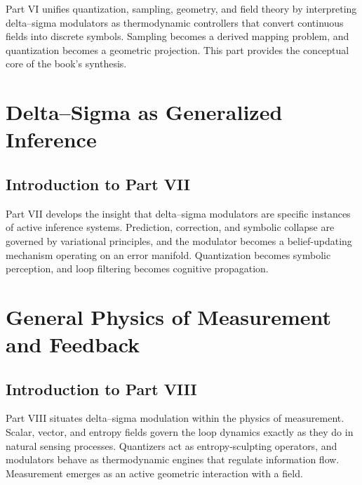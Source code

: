 \documentclass[12pt,oneside]{book}
\theoremstyle{definition}
\theoremstyle{plain}
\begin{document}
Part VI unifies quantization, sampling, geometry, and field theory by interpreting delta--sigma modulators as thermodynamic controllers that convert continuous fields into discrete symbols. Sampling becomes a derived mapping problem, and quantization becomes a geometric projection. This part provides the conceptual core of the book’s synthesis.






\part{Delta--Sigma as Generalized Inference}

\chapter*{Introduction to Part VII}

Part VII develops the insight that delta--sigma modulators are specific instances of active inference systems. Prediction, correction, and symbolic collapse are governed by variational principles, and the modulator becomes a belief-updating mechanism operating on an error manifold. Quantization becomes symbolic perception, and loop filtering becomes cognitive propagation.








\part{General Physics of Measurement and Feedback}

\chapter*{Introduction to Part VIII}

Part VIII situates delta--sigma modulation within the physics of measurement. Scalar, vector, and entropy fields govern the loop dynamics exactly as they do in natural sensing processes. Quantizers act as entropy-sculpting operators, and modulators behave as thermodynamic engines that regulate information flow. Measurement emerges as an active geometric interaction with a field.
\end{document}

